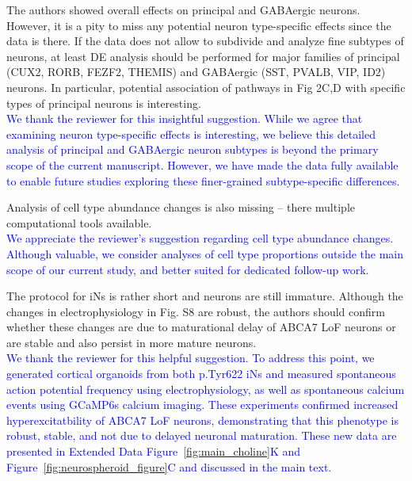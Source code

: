 The authors showed overall effects on principal and GABAergic neurons. However, it is a pity to miss any potential neuron type-specific effects since the data is there. If the data does not allow to subdivide and analyze fine subtypes of neurons, at least DE analysis should be performed for major families of principal (CUX2, RORB, FEZF2, THEMIS) and GABAergic (SST, PVALB, VIP, ID2) neurons. In particular, potential association of pathways in Fig 2C,D with specific types of principal neurons is interesting.\\
\textcolor{blue}{We thank the reviewer for this insightful suggestion. While we agree that examining neuron type-specific effects is interesting, we believe this detailed analysis of principal and GABAergic neuron subtypes is beyond the primary scope of the current manuscript. However, we have made the data fully available to enable future studies exploring these finer-grained subtype-specific differences.}

Analysis of cell type abundance changes is also missing – there multiple computational tools available.\\
\textcolor{blue}{We appreciate the reviewer’s suggestion regarding cell type abundance changes. Although valuable, we consider analyses of cell type proportions outside the main scope of our current study, and better suited for dedicated follow-up work.}

The protocol for iNs is rather short and neurons are still immature. Although the changes in electrophysiology in Fig. S8 are robust, the authors should confirm whether these changes are due to maturational delay of ABCA7 LoF neurons or are stable and also persist in more mature neurons.\\
\textcolor{blue}{We thank the reviewer for this helpful suggestion. To address this point, we generated cortical organoids from both p.Tyr622 iNs and measured spontaneous action potential frequency using electrophysiology, as well as spontaneous calcium events using GCaMP6s calcium imaging. These experiments confirmed increased hyperexcitatbility of ABCA7 LoF neurons, demonstrating that this phenotype is robust, stable, and not due to delayed neuronal maturation. These new data are presented in Extended Data Figure~\ref{fig:main_choline}K and Figure~\ref{fig:neurospheroid_figure}C and discussed in the main text.}

